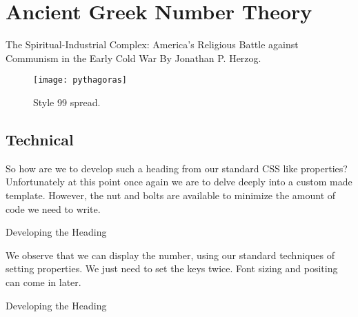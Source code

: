 \chapter[Template 99]{Ancient Greek Number Theory}


\thispagestyle{plain}
\pagestyle{headings}

The Spiritual-Industrial Complex: America's Religious Battle against Communism in the Early Cold War
 By Jonathan P. Herzog. \lipsum[1]

\begin{figure}[ht]
\centering
\texttt{[image: pythagoras]}
\caption{Style 99 spread.}
\end{figure}


\section{Technical}

So how are we to develop such a heading from our standard CSS like properties? Unfortunately at this point once
again we are to delve deeply into a custom made template. However, the nut and bolts are available to minimize the amount of code we need to write. 

\begin{texexample}{Developing the Heading}{}
\begin{tcolorbox}[arc=0pt, outer arc=0pt]
\thechapter  
{}
\thechapter
\end{tcolorbox}
\end{texexample}

We observe that we can display the number, using our standard techniques of setting properties. We just need to set the keys twice. Font sizing and positing can come in later.

\begin{texexample}{Developing the Heading}{}
\begin{tcolorbox}[arc=0pt, outer arc=0pt]
\thechapter\par
  
\thechapter\par
\end{tcolorbox}
\end{texexample}



\begin{tcolorbox}[arc=0pt, outer arc=0pt,colback=pythagoras,colframe=pythagoras]
\makeatletter
\def\doublenumbers#1{%
   \mbox{{\color{white}\bfseries\sffamily\HHHUGE\@arabic\c@chapter}}%
   \hspace*{-2.5em}\mbox{\color{thelightgray}\bfseries\sffamily\LARGE\so#1}}
\doublenumbers{\thechapter}
\makeatother
\end{tcolorbox}




 
